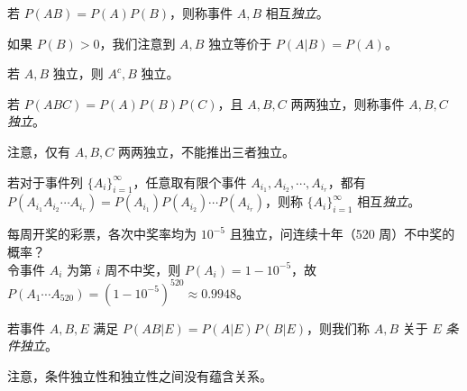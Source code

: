 \documentclass[../main.tex]{subfiles}
\begin{document}
\begin{definition}\label{def:1.7.1}
    若 $P(AB)=P(A)P(B)$，则称事件 $A,B$ 相互\emph{独立}。
\end{definition}

如果 $P(B)>0$，我们注意到 $A,B$ 独立等价于 $P(A|B)=P(A)$。

\begin{proposition}
    若 $A,B$ 独立，则 $A^c,B$ 独立。
\end{proposition}

\begin{definition}\label{def:1.7.2}
    若 $P(ABC)=P(A)P(B)P(C)$，且 $A,B,C$ 两两独立，则称事件 $A,B,C$ \emph{独立}。
\end{definition}

注意，仅有 $A,B,C$ 两两独立，不能推出三者独立。

\begin{definition}\label{def:1.7.3}
    若对于事件列 $\{A_i\}_{i=1}^\infty$，任意取有限个事件 $A_{i_1},A_{i_2},\cdots,A_{i_r}$，都有 $P(A_{i_1}A_{i_2}\cdots A_{i_r})=P(A_{i_1})P(A_{i_2})\cdots P(A_{i_r})$，则称 $\{A_i\}_{i=1}^\infty$ 相互\emph{独立}。
\end{definition}

\begin{example}
    每周开奖的彩票，各次中奖率均为 $10^{-5}$ 且独立，问连续十年（520 周）不中奖的概率？\\
    令事件 $A_i$ 为第 $i$ 周不中奖，则 $P(A_i)=1-10^{-5}$，故 $P(A_1\cdots A_{520})=(1-10^{-5})^{520}\approx 0.9948$。
\end{example}

\begin{definition}\label{def:1.7.4}
    若事件 $A,B,E$ 满足 $P(AB|E)=P(A|E)P(B|E)$，则我们称 $A,B$ 关于 $E$ \emph{条件独立}。
\end{definition}

注意，条件独立性和独立性之间没有蕴含关系。
\end{document}
